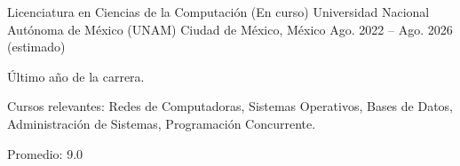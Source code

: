 \begin{cventries}

  \cventry
    {Licenciatura en Ciencias de la Computación (En curso)}
    {Universidad Nacional Autónoma de México (UNAM)}
    {Ciudad de México, México}
    {Ago. 2022 -- Ago. 2026 (estimado)}
    {
      \begin{cvitems}
        \item {Último año de la carrera.}
        \item {Cursos relevantes: Redes de Computadoras, Sistemas Operativos, Bases de Datos, Administración de Sistemas, Programación Concurrente.}
        \item {Promedio: 9.0}
      \end{cvitems}
    }

\end{cventries}
